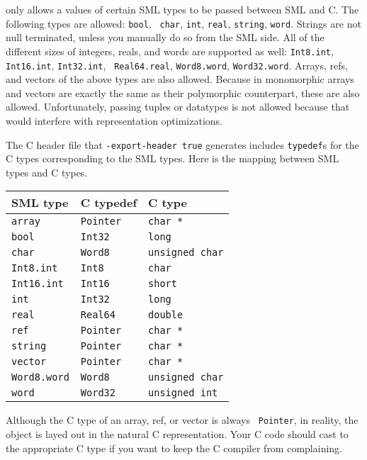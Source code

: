 {\mlton} only allows a values of certain SML types to be passed
between SML and C.  The following types are allowed: {\tt bool}, {\tt
char}, {\tt int}, {\tt real}, {\tt string}, {\tt word}.  Strings are
not null terminated, unless you manually do so from the SML side.  All
of the different sizes of integers, reals, and words are supported as
well: {\tt Int8.int}, {\tt Int16.int}, {\tt Int32.int}, {\tt
Real64.real}, {\tt Word8.word}, {\tt Word32.word}.  Arrays, refs, and
vectors of the above types are also allowed.  Because in {\mlton}
monomorphic arrays and vectors are exactly the same as their
polymorphic counterpart, these are also allowed.  Unfortunately,
passing tuples or datatypes is not allowed because that would
interfere with representation optimizations.

The C header file that {\tt -export-header true} generates includes
{\tt typedef}s for the C types corresponding to the SML types.  Here
is the mapping between SML types and C types.

\begin{center}
\begin{tabular}{l|l|l}
SML type & C typedef & C type\\
\hline
{\tt array} & {\tt Pointer} & {\tt char *} \\
{\tt bool} & {\tt Int32} & {\tt long} \\
{\tt char} & {\tt Word8} & {\tt unsigned char} \\
{\tt Int8.int} & {\tt Int8} & {\tt char} \\
{\tt Int16.int} & {\tt Int16} & {\tt short} \\
{\tt int} & {\tt Int32} & {\tt long} \\
{\tt real} & {\tt Real64} & {\tt double} \\
{\tt ref} & {\tt Pointer} & {\tt char *} \\
{\tt string} & {\tt Pointer} & {\tt char *} \\
{\tt vector} & {\tt Pointer} & {\tt char *} \\
{\tt Word8.word} & {\tt Word8} & {\tt unsigned char} \\
{\tt word} & {\tt Word32} & {\tt unsigned int} \\
\end{tabular}
\end{center}

Although the C type of an array, ref, or vector is always {\tt
Pointer}, in reality, the object is layed out in the natural C
representation.  Your C code should cast to the appropriate C type if
you want to keep the C compiler from complaining.

